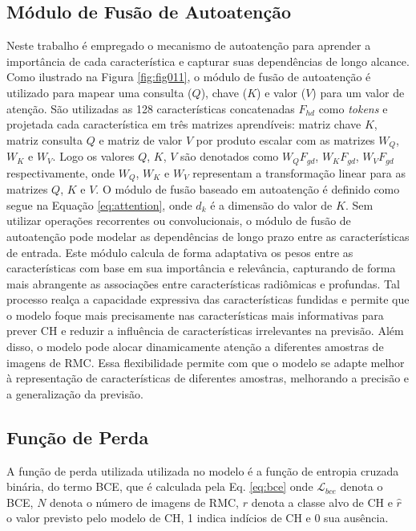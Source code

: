 \subsection{Módulo de Fusão de Autoatenção}
\label{subsec:cap4_mod_self_attention}

Neste trabalho é empregado o mecanismo de autoatenção para aprender a importância de cada característica e capturar suas dependências de longo alcance. Como ilustrado na Figura \ref{fig:fig011}, o módulo de fusão de autoatenção é utilizado para mapear uma consulta ($Q$), chave ($K$) e valor ($V$) para um valor de atenção. São utilizadas as 128 características concatenadas $F_{hd}$  como \textit{tokens} e projetada cada característica em três matrizes aprendíveis: matriz chave $K$, matriz consulta $Q$ e matriz de valor $V$ por produto escalar com as matrizes $W_{Q}$, $W_{K}$ e $W_{V}$. Logo os valores $Q$, $K$, $V$ são denotados como $W_{Q}F_{gd}$, $W_{K}F_{gd}$, $W_{V}F_{gd}$ respectivamente, onde $W_{Q}$, $W_{K}$ e $W_{V}$ representam a transformação linear para as matrizes $Q$, $K$ e $V$. O módulo de fusão baseado em autoatenção é definido como segue na Equação \ref{eq:attention}, onde $d_{k}$ é a dimensão do valor de $K$. Sem utilizar operações recorrentes ou convolucionais, o módulo de fusão de autoatenção pode modelar as dependências de longo prazo entre as características de entrada.      Este módulo calcula de forma adaptativa os pesos entre as características com base em sua importância e relevância, capturando de forma mais abrangente as associações entre características radiômicas e profundas. Tal processo realça a capacidade expressiva das características fundidas e permite que o modelo foque mais precisamente nas características mais informativas para prever \gls{CH} e reduzir a influência de características irrelevantes na previsão. Além disso, o modelo pode alocar dinamicamente atenção a diferentes amostras de imagens de \gls{RMC}. Essa flexibilidade permite com que o modelo se adapte melhor à representação de características de diferentes amostras, melhorando a precisão e a generalização da previsão.

\subsection{Função de Perda}
\label{subsec:cap4_funcao_perda}

A função de perda utilizada utilizada no modelo é a função de entropia cruzada binária, do termo  \gls{BCE}, que é calculada pela Eq. \ref{eq:bce} onde $\mathcal{L}_{bce}$ denota o \gls{BCE}, $N$ denota o número de imagens de \gls{RMC}, $r$ denota a classe alvo de \gls{CH} e $\hat{r}$ o valor previsto pelo modelo de \gls{CH}, 1 indica indícios de \gls{CH} e 0 sua ausência.

